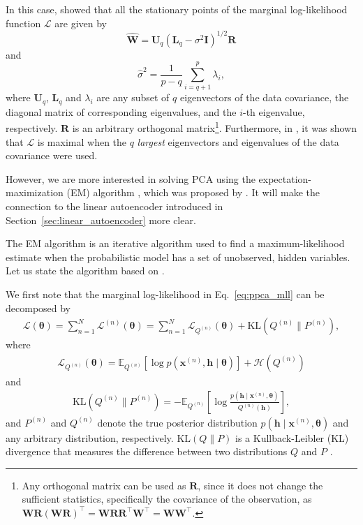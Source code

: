 \documentclass[dissertation,nocontribution,draft*]{aaltoseries}
\newcommand{\vect}[1]{\mathbf{#1}}
\newcommand{\vects}[1]{\boldsymbol{#1}}
\newcommand{\matr}[1]{\mathbf{#1}}
\newcommand{\vh}[0]{\vect{h}}
\newcommand{\vx}[0]{\vect{x}}
\newcommand{\mW}[0]{\matr{W}}
\newcommand{\mU}[0]{\matr{U}}
\newcommand{\mR}[0]{\matr{R}}
\newcommand{\mI}{\matr{I}}
\newcommand{\mL}{\matr{L}}
\newcommand{\TT}[0]{{\vects{\theta}}}
\newcommand{\LL}[0]{\mathcal{L}}
\newcommand{\HH}[0]{\mathcal{H}}
\newcommand{\KL}[0]{\text{KL}}
\newcommand{\E}[0]{\mathbb{E}}
\begin{document}
In this case, \citet{Tipping1999} showed that all the 
stationary points of the marginal log-likelihood function
$\LL$ are given by
\[
\hat{\mW} = \mU_q \left( \mL_q - \sigma^2 \mI \right)^{1/2}
\mR
\]
and
\[
\hat{\sigma}^2 = \frac{1}{p - q} \sum_{i=q+1}^p \lambda_i,
\]
where $\mU_q$, $\mL_q$ and $\lambda_i$ are any subset of
$q$ eigenvectors of the data covariance, the diagonal matrix
of corresponding eigenvalues, and the $i$-th eigenvalue,
respectively. $\mR$ is an arbitrary orthogonal
matrix\footnote{
Any orthogonal matrix can be used as $\mR$, since it does
not change the sufficient statistics, specifically the
covariance of the observation, as $\mW\mR\left( \mW\mR\right)^\top
= \mW\mR \mR^\top \mW^\top = \mW\mW^\top$.
}.
Furthermore, in \citep{Tipping1999}, it was shown that $\LL$
is maximal when the $q$ \textit{largest} eigenvectors and
eigenvalues of the data covariance were used.

However, we are more interested in solving PCA using
the expectation-maximization
(EM) algorithm
\citep{Dempster1977}, which was proposed by
\citet{Roweis1998}.  It will make the connection to the
linear autoencoder introduced in
Section~\ref{sec:linear_autoencoder} more clear.

The EM algorithm is an iterative algorithm used to find a
maximum-likelihood estimate when the probabilistic model
has a set of unobserved, hidden variables. Let us state the
algorithm based on \citep{Neal1999,Bishop2006}.

We first note that the marginal log-likelihood in
Eq.~\eqref{eq:ppca_mll} can be decomposed by
\begin{align}
    \label{eq:mll_decom}
    \LL(\TT) = \sum_{n=1}^N \LL^{(n)}(\TT) = \sum_{n=1}^N
    \LL_{Q^{(n)}}(\TT) + \KL(Q^{(n)} \| P^{(n)}),
\end{align}
where
\begin{align}
    \label{eq:mll_post}
    \LL_{Q^{(n)}}(\TT) = \E_{Q^{(n)}} \left[ \log
    p(\vx^{(n)}, \vh \mid
    \TT)\right] + \HH(Q^{(n)})
\end{align}
and
\begin{align}
    \label{eq:kldiv}
    \KL(Q^{(n)} \| P^{(n)}) = -\E_{Q^{(n)}} \left[ \log
    \frac{p(\vh \mid \vx^{(n)},
    \TT)}{Q^{(n)}(\vh)} \right],
\end{align}
and $P^{(n)}$ and $Q^{(n)}$ denote the true posterior distribution
$p(\vh \mid \vx^{(n)}, \TT)$ and any arbitrary distribution,
respectively. $\KL(Q \| P)$ is a Kullback-Leibler
(KL)
divergence that measures the difference between two
distributions $Q$ and $P$ \citep{Kullback1951}.
\end{document}
